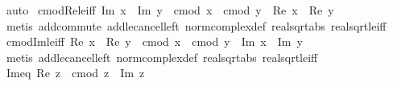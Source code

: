 \begin{isabellebody}
\ auto%
\endisatagproof
{\isafoldproof}%
%
\isadelimproof
\isanewline
%
\endisadelimproof
\isanewline
{}\isamarkupfalse%
\ cmod{\isacharunderscore}{\kern0pt}Re{\isacharunderscore}{\kern0pt}le{\isacharunderscore}{\kern0pt}iff{\isacharcolon}{\kern0pt}\ {\isachardoublequoteopen}Im\ x\ {\isacharequal}{\kern0pt}\ Im\ y\ {\isasymLongrightarrow}\ cmod\ x\ {\isasymle}\ cmod\ y\ {\isasymlongleftrightarrow}\ {\isasymbar}Re\ x{\isasymbar}\ {\isasymle}\ {\isasymbar}Re\ y{\isasymbar}{\isachardoublequoteclose}\isanewline
%
\isadelimproof
\ \ %
\endisadelimproof
%
\isatagproof
{}\isamarkupfalse%
\ {\isacharparenleft}{\kern0pt}metis\ add{\isachardot}{\kern0pt}commute\ add{\isacharunderscore}{\kern0pt}le{\isacharunderscore}{\kern0pt}cancel{\isacharunderscore}{\kern0pt}left\ norm{\isacharunderscore}{\kern0pt}complex{\isacharunderscore}{\kern0pt}def\ real{\isacharunderscore}{\kern0pt}sqrt{\isacharunderscore}{\kern0pt}abs\ real{\isacharunderscore}{\kern0pt}sqrt{\isacharunderscore}{\kern0pt}le{\isacharunderscore}{\kern0pt}iff{\isacharparenright}{\kern0pt}%
\endisatagproof
{\isafoldproof}%
%
\isadelimproof
\isanewline
%
\endisadelimproof
\isanewline
{}\isamarkupfalse%
\ cmod{\isacharunderscore}{\kern0pt}Im{\isacharunderscore}{\kern0pt}le{\isacharunderscore}{\kern0pt}iff{\isacharcolon}{\kern0pt}\ {\isachardoublequoteopen}Re\ x\ {\isacharequal}{\kern0pt}\ Re\ y\ {\isasymLongrightarrow}\ cmod\ x\ {\isasymle}\ cmod\ y\ {\isasymlongleftrightarrow}\ {\isasymbar}Im\ x{\isasymbar}\ {\isasymle}\ {\isasymbar}Im\ y{\isasymbar}{\isachardoublequoteclose}\isanewline
%
\isadelimproof
\ \ %
\endisadelimproof
%
\isatagproof
{}\isamarkupfalse%
\ {\isacharparenleft}{\kern0pt}metis\ add{\isacharunderscore}{\kern0pt}le{\isacharunderscore}{\kern0pt}cancel{\isacharunderscore}{\kern0pt}left\ norm{\isacharunderscore}{\kern0pt}complex{\isacharunderscore}{\kern0pt}def\ real{\isacharunderscore}{\kern0pt}sqrt{\isacharunderscore}{\kern0pt}abs\ real{\isacharunderscore}{\kern0pt}sqrt{\isacharunderscore}{\kern0pt}le{\isacharunderscore}{\kern0pt}iff{\isacharparenright}{\kern0pt}%
\endisatagproof
{\isafoldproof}%
%
\isadelimproof
\isanewline
%
\endisadelimproof
\isanewline
{}\isamarkupfalse%
\ Im{\isacharunderscore}{\kern0pt}eq{\isacharunderscore}{\kern0pt}{}{\isacharcolon}{\kern0pt}\ {\isachardoublequoteopen}{\isasymbar}Re\ z{\isasymbar}\ {\isacharequal}{\kern0pt}\ cmod\ z\ {\isasymLongrightarrow}\ Im\ z\ {\isacharequal}{\kern0pt}\ {}{\isachardoublequoteclose}\isanewline
%
\isadelimproof
\ \ %
\endisadelimproof
%

\end{isabellebody}
